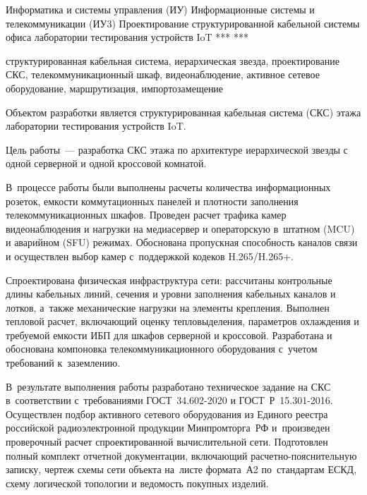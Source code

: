 \documentclass{bmstu}
\begin{document}
\makeresearchtitle
{Информатика и системы управления (ИУ)} %
{Информационные системы и телекоммуникации (ИУ3)} %
{Проектирование структурированной кабельной системы офиса лаборатории тестирования устройств IoT} %
{***} %
{***} %
{} %

\begin{essay}{структурированная кабельная система, иерархическая звезда, проектирование СКС, телекоммуникационный шкаф, видеонаблюдение, активное сетевое оборудование, маршрутизация, импортозамещение}

Объектом разработки является структурированная кабельная система (СКС) этажа лаборатории тестирования устройств IoT.

Цель работы~--- разработка СКС этажа по архитектуре иерархической звезды с одной серверной и одной кроссовой комнатой.

В~процессе работы были выполнены расчеты количества информационных розеток, емкости коммутационных панелей и плотности заполнения телекоммуникационных шкафов. Проведен расчет трафика камер видеонаблюдения и нагрузки на медиасервер и операторскую в~штатном (MCU) и аварийном (SFU) режимах. Обоснована пропускная способность каналов связи и осуществлен выбор камер с~поддержкой кодеков H.265/H.265+.

Спроектирована физическая инфраструктура сети: рассчитаны контрольные длины кабельных линий, сечения и уровни заполнения кабельных каналов и лотков, а~также механические нагрузки на элементы крепления. Выполнен тепловой расчет, включающий оценку тепловыделения, параметров охлаждения и требуемой емкости ИБП для шкафов серверной и кроссовой. Разработана и обоснована компоновка телекоммуникационного оборудования с~учетом требований к~заземлению.

В~результате выполнения работы разработано техническое задание на СКС в~соответствии с~требованиями ГОСТ~34.602-2020 и ГОСТ~Р~15.301-2016. Осуществлен подбор активного сетевого оборудования из Единого реестра российской радиоэлектронной продукции Минпромторга~РФ и~произведен проверочный расчет спроектированной вычислительной сети. Подготовлен полный комплект отчетной документации, включающий расчетно-пояснительную записку, чертеж схемы сети объекта на~листе формата~А2 по~стандартам ЕСКД, схему логической топологии и ведомость покупных изделий.
\end{essay}
\end{document}

